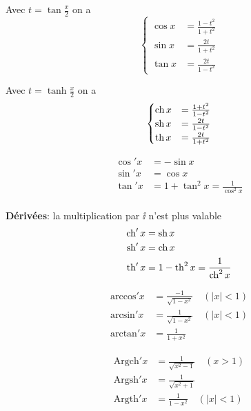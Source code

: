 \documentclass[10pt,class=article,crop=false]{standalone}
\begin{document}

\begin{multicols}{2}
	Avec \quad $t=\tan \frac{x}{2}$ \quad on a \quad
	$$
	\begin{cases}
		\cos x &= \frac {1-t^2}{1+t^2} \\
		\sin x &= \frac{2t}{1+t^2} \\
		\tan x &= \frac{2t}{1-t^2}
	\end{cases}$$
	
	Avec \quad $t=\tanh \frac{x}{2}$ \quad on a \quad
	$$
	\begin{cases}
		\operatorname{ch} x &= \frac {1+t^2}{1-t^2} \\
		\operatorname{sh} x &= \frac{2t}{1-t^2} \\
		\operatorname{th} x &= \frac{2t}{1+t^2}
	\end{cases}$$
\end{multicols}

\begin{multicols}{2}
	
	
	\begin{align*}
		\cos'x&= -\sin x\\
		\sin'x&=\cos x\\
		\tan' x &= 1+\tan^2x=\frac{1}{\cos^2x}\\
	\end{align*}%

\textbf{D\'eriv\'ees}: la multiplication par $\ii$ n'est plus valable
	\begin{align*}
		\operatorname{ch}'x&= \operatorname{sh} x\\
		\operatorname{sh}'x&=\operatorname{ch} x\\
		\operatorname{th}' x &= 1-\operatorname{th}^2x=\frac{1}{\operatorname{ch}^2x}\\
	\end{align*}
\end{multicols}


\begin{multicols}{2}

	\begin{align*}
		\text{arccos}'x&=\frac{-1}{\sqrt{1-x^2}} \quad (|x|<1)\\
		\text{arcsin}'x&=\frac{1}{\sqrt{1-x^2}} \quad (|x|<1)\\
		\text{arctan}'x&=\frac{1}{1+x^2}
	\end{align*}%

	\begin{align*}
		\text{Argch}'x&=\frac{1}{\sqrt{x^2-1}} \quad (x>1)\\
		\text{Argsh}'x&=\frac{1}{\sqrt{x^2+1}} \\
		\text{Argth}'x&=\frac{1}{1-x^2} \quad (|x|<1)
	\end{align*}
	
\end{multicols}
\end{document}
